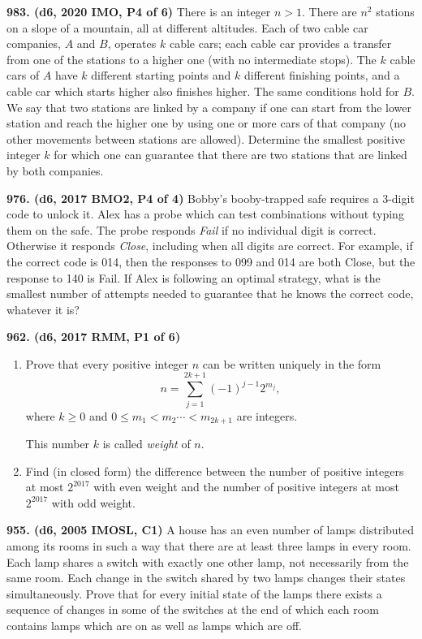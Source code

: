 \documentclass{article}
\begin{document}
        \textbf{983. (\color{red}d6\color{black}, 2020 IMO, P4 of 6)} There is an integer $n > 1$. There are $n^2$ stations on a slope of a mountain, all at different altitudes. Each of two cable car companies, $A$ and $B$, operates $k$ cable cars; each cable car provides a transfer from one of the stations to a higher one (with no intermediate stops). The $k$ cable cars of $A$ have $k$ different starting points and $k$ different finishing points, and a cable car which starts higher also finishes higher. The same conditions hold for $B$. We say that two stations are linked by a company if one can start from the lower station and reach the higher one by using one or more cars of that company (no other movements between stations are allowed). Determine the smallest positive integer $k$ for which one can guarantee that there are two stations that are linked by both companies.

        \textbf{976. (\color{red}d6\color{black}, 2017 BMO2, P4 of 4)} Bobby's booby-trapped safe requires a 3-digit code to unlock it. Alex has a probe which can test combinations without typing them on the safe. The probe responds \textit{Fail} if no individual digit is correct. Otherwise it responds \textit{Close}, including when all digits are correct. For example, if the correct code is 014, then the responses to 099 and 014 are both Close, but the response to 140 is Fail. If Alex is following an optimal strategy, what is the smallest number of attempts needed to guarantee that he knows the correct code, whatever it is?

        \textbf{962. (\color{red}d6\color{black}, 2017 RMM, P1 of 6)}
        \begin{enumerate}
                \item Prove that every positive integer $n$ can be written uniquely in the form \[n=\sum_{j=1}^{2k+1}(-1)^{j-1}2^{m_j},\]where $k\geq 0$ and $0\le m_1<m_2\cdots <m_{2k+1}$ are integers.

                      This number $k$ is called \textit{weight} of $n$.

                \item Find (in closed form) the difference between the number of positive integers at most $2^{2017}$ with even weight and the number of positive integers at most $2^{2017}$ with odd weight.
        \end{enumerate}

        \textbf{955. (\color{red}d6\color{black}, 2005 IMOSL, C1)} A house has an even number of lamps distributed among its rooms in such a way that there are at least three lamps in every room. Each lamp shares a switch with exactly one other lamp, not necessarily from the same room. Each change in the switch shared by two lamps changes their states simultaneously. Prove that for every initial state of the lamps there exists a sequence of changes in some of the switches at the end of which each room contains lamps which are on as well as lamps which are off.
\end{document}

